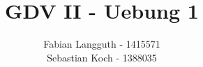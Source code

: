 \documentclass[a4paper,11pt]{scrartcl}
\title{GDV II - Uebung 1}
\author{Fabian Langguth - 1415571\\ Sebastian Koch - 1388035}
\begin{document}
\maketitle

\newcommand{\vect}[1]{\ensuremath{\left( \begin{matrix}#1\end{matrix}\right)}}






\end{document}
